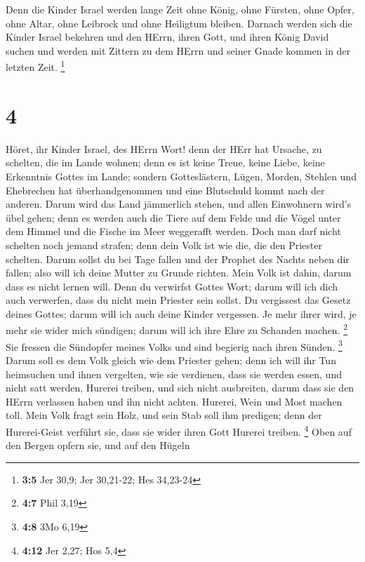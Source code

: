  Denn die Kinder Israel werden lange Zeit ohne König, ohne
Fürsten, ohne Opfer, ohne Altar, ohne Leibrock und ohne Heiligtum
bleiben.  Darnach werden sich die Kinder Israel bekehren und
den HErrn, ihren Gott, und ihren König David suchen und werden mit
Zittern zu dem HErrn und seiner Gnade kommen in der letzten Zeit.
\footnote{\textbf{3:5} Jer 30,9; Jer 30,21-22; Hes 34,23-24}

\hypertarget{section-1}{%
\section{4}\label{section-1}}

 Höret, ihr Kinder Israel, des HErrn Wort! denn der HErr hat
Ursache, zu schelten, die im Lande wohnen; denn es ist keine Treue,
keine Liebe, keine Erkenntnis Gottes im Lande;  sondern
Gotteslästern, Lügen, Morden, Stehlen und Ehebrechen hat
überhandgenommen und eine Blutschuld kommt nach der anderen.
 Darum wird das Land jämmerlich stehen, und allen Einwohnern
wird's übel gehen; denn es werden auch die Tiere auf dem Felde und die
Vögel unter dem Himmel und die Fische im Meer weggerafft werden.
 Doch man darf nicht schelten noch jemand strafen; denn dein
Volk ist wie die, die den Priester schelten.  Darum sollst
du bei Tage fallen und der Prophet des Nachts neben dir fallen; also
will ich deine Mutter zu Grunde richten.  Mein Volk ist
dahin, darum dass es nicht lernen will. Denn du verwirfst Gottes Wort;
darum will ich dich auch verwerfen, dass du nicht mein Priester sein
sollst. Du vergissest das Gesetz deines Gottes; darum will ich auch
deine Kinder vergessen.  Je mehr ihrer wird, je mehr sie
wider mich sündigen; darum will ich ihre Ehre zu Schanden machen.
\footnote{\textbf{4:7} Phil 3,19}  Sie fressen die Sündopfer
meines Volks und sind begierig nach ihren Sünden. \footnote{\textbf{4:8}
  3Mo 6,19}  Darum soll es dem Volk gleich wie dem Priester
gehen; denn ich will ihr Tun heimsuchen und ihnen vergelten, wie sie
verdienen,  dass sie werden essen, und nicht satt werden,
Hurerei treiben, und sich nicht ausbreiten, darum dass sie den HErrn
verlassen haben und ihn nicht achten.  Hurerei, Wein und
Most machen toll.  Mein Volk fragt sein Holz, und sein Stab
soll ihm predigen; denn der Hurerei-Geist verführt sie, dass sie wider
ihren Gott Hurerei treiben. \footnote{\textbf{4:12} Jer 2,27; Hos 5,4}
 Oben auf den Bergen opfern sie, und auf den Hügeln
